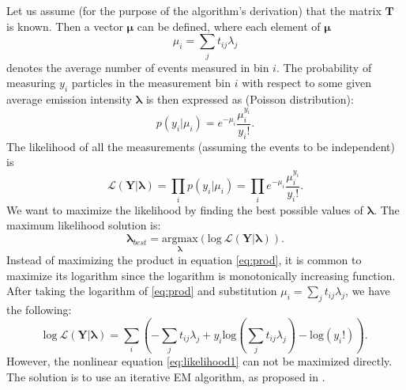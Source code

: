 Let us assume (for the purpose of the algorithm's derivation) that the matrix $\mathbf{T}$ is known.
Then a vector $\bm{\mu}$ can be defined, where each element of $\bm{\mu}$ 
\begin{equation}
  \mu_{i} = \sum_{j} t_{ij}\lambda_{j}
  \label{eq:mu}
\end{equation}
denotes the average number of events measured in bin $i$.
The probability of measuring $y_{i}$ particles in the measurement bin $i$ with respect to some given average emission intensity $\bm{\lambda}$ is then expressed as (Poisson distribution):
\begin{equation}
  p(y_{i} |\mu_{i} ) = e^{-\mu_{i}} \frac{\mu_{i}^{y_i}}{y_{i}!}.
\end{equation}
The likelihood of all the measurements (assuming the events to be independent) is
\begin{equation}  
  \mathcal{L}(\mathbf{Y} | \mathbf{\lambda}) = \prod_{i}p(y_{i} |\mu_{i} ) = \prod_{i} e^{-\mu_{i}} \frac{\mu_{i}^{y_i}}{y_{i}!}.
  \label{eq:prod}
\end{equation}
We want to maximize the likelihood by finding the best possible values of $\bm{\lambda}$. 
The maximum likelihood solution is:
\begin{equation}
  \mathbf{\lambda}_{best} = \underset{\mathbf{\lambda}}{\mathrm{argmax}}( \mathrm{log}\ \mathcal{L}(\mathbf{Y} | \mathbf{\lambda})).
\end{equation}
Instead of maximizing the product in equation \ref{eq:prod}, it is common to maximize its logarithm since the logarithm is monotonically increasing function.
After taking the logarithm of \ref{eq:prod} and substitution $\mu_{i} = \sum_{j} t_{ij}\lambda_{j}$, we have the following:
\begin{equation}  
  \mathrm{log}\ \mathcal{L}(\mathbf{Y} | \mathbf{\lambda}) = \sum_{i}\left ( -\sum_{j} t_{ij}\lambda_{j} + y_{i} \mathrm{log}(\sum_{j} t_{ij}\lambda_{j})  - \mathrm{log}(y_{i}!) \right ).
  \label{eq:likelihood1}
\end{equation}
However, the nonlinear equation \ref{eq:likelihood1} can not be maximized directly.
The solution is to use an iterative \ac{EM} algorithm, as proposed in \cite{MLEM_Lange_Carlson_1984}.
